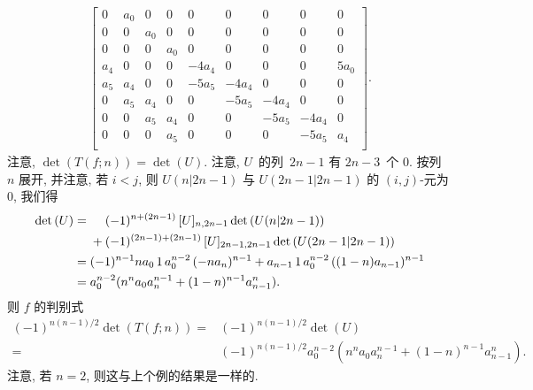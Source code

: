 \documentclass[../libro.tex]{subfiles}
\begin{document}
\begin{example}
\begin{align*}
\begin{bmatrix}
            0   & a_0 & 0   & 0   & 0     & 0     & 0     & 0     & 0    \\
            0   & 0   & a_0 & 0   & 0     & 0     & 0     & 0     & 0    \\
            0   & 0   & 0   & a_0 & 0     & 0     & 0     & 0     & 0    \\
            a_4 & 0   & 0   & 0   & -4a_4 & 0     & 0     & 0     & 5a_0 \\
            a_5 & a_4 & 0   & 0   & -5a_5 & -4a_4 & 0     & 0     & 0    \\
            0   & a_5 & a_4 & 0   & 0     & -5a_5 & -4a_4 & 0     & 0    \\
            0   & 0   & a_5 & a_4 & 0     & 0     & -5a_5 & -4a_4 & 0    \\
            0   & 0   & 0   & a_5 & 0     & 0     & 0     & -5a_5 & a_4  \\
        \end{bmatrix}.
    \end{align*}
    注意,
    \(\det {(T(f; n))} = \det {(U)}\).
    注意, \(U\)~的列~\(2n-1\) 有 \(2n-3\)~个 \(0\).
    按列~\(n\) 展开,
    并注意, 若 \(i < j\),
    则 \(U(n|{2n-1})\) 与 \(U({2n-1}|{2n-1})\)
    的 \((i, j)\)-元为 \(0\),
    我们得
    \begin{align*}
        \det {(U)}
        = {} &
        \hphantom{{} + {}}
        (-1)^{n+(2n-1)}\, [U]_{n,2n-1} \det {(U(n|{2n-1}))}
        \\
        &
        +
        (-1)^{(2n-1)+(2n-1)}\,
        [U]_{2n-1,2n-1} \det {(U({2n-1}|{2n-1}))}
        \\
        = {} &
        (-1)^{n-1} n a_0\, 1\, a_0^{n-2}\, (-n a_n)^{n-1}
        + a_{n-1}\, 1\, a_0^{n-2}\, ((1-n) a_{n-1})^{n-1}
        \\
        = {} &
        a_0^{n-2}
        (n^n a_0 a_n^{n-1} + (1-n)^{n-1} a_{n-1}^n).
    \end{align*}
    则 \(f\) 的判别式
    \begin{align*}
        (-1)^{n(n-1)/2} \det {(T(f; n))}
        = {} &
        (-1)^{n(n-1)/2} \det {(U)}
        \\
        = {} &
        (-1)^{n(n-1)/2} a_0^{n-2}
        (n^n a_0 a_n^{n-1} + (1-n)^{n-1} a_{n-1}^n).
    \end{align*}
    注意, 若 \(n = 2\), 则这与上个例的结果是一样的.
\end{example}
\end{document}
